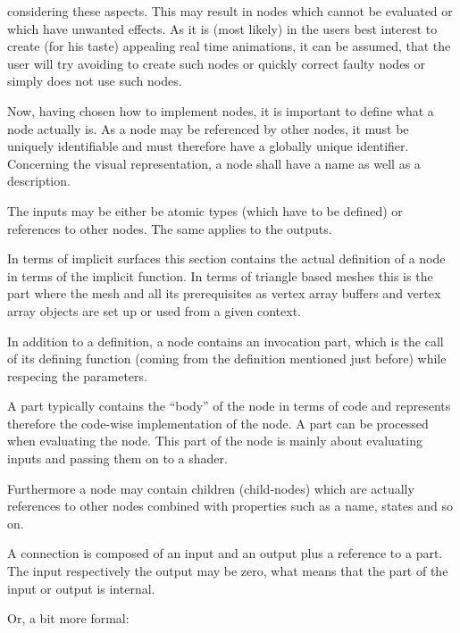 \documentclass[%
    a4paper,    %
    justified,  %
    nobib,      %
    openany     %
]{tufte-book}
\begin{document}
 considering these
aspects. This may result in nodes which cannot be evaluated or which have
unwanted effects. As it is (most likely) in the users best interest to create
(for his taste) appealing real time animations, it can be assumed, that the user
will try avoiding to create such nodes or quickly correct faulty nodes or simply
does not use such nodes.

Now, having chosen how to implement nodes, it is important to define what a node
actually is. As a node may be referenced by other nodes, it must be uniquely
identifiable and must therefore have a globally unique identifier. Concerning
the visual representation, a node shall have a name as well as a description.

 The
inputs may be either be atomic types (which have to be defined) or references to
other nodes. The same applies to the outputs.

 In terms of implicit surfaces
this section contains the actual definition of a node in terms of the implicit
function. In terms of triangle based meshes this is the part where the mesh and
all its prerequisites as vertex array buffers and vertex array objects are set
up or used from a given context.

In addition to a definition, a node contains an invocation part, which is the
call of its defining function (coming from the definition mentioned just
before) while respecing the parameters.

 A part typically
contains the \enquote{body} of the node in terms of code and represents
therefore the code-wise implementation of the node. A part can be processed when
evaluating the node. This part of the node is mainly about evaluating inputs and
passing them on to a shader.

Furthermore a node may contain children (child-nodes) which are actually
references to other nodes combined with properties such as a name, states and so
on.

 A connection is composed
of an input and an output plus a reference to a part. The input respectively the
output may be zero, what means that the part of the input or output is internal.

Or, a bit more formal:
\end{document}
